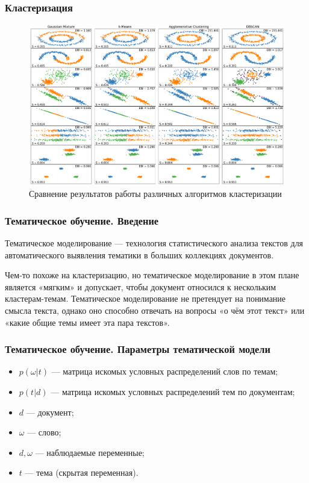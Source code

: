 \documentclass[ucs, notheorems, handout]{beamer}
\begin{document}
		\begin{frame}
	\frametitle{Кластеризация}
	\begin{figure}[H]
	\begin{center}
		\includegraphics[scale = 0.2]{qual.png}
		\caption{Сравнение результатов работы различных алгоритмов кластеризации}
	\end{center}
\end{figure}

	\end{frame}
	
	\begin{frame}
	\frametitle{Тематическое обучение. Введение}
	Тематическое моделирование --- технология статистического анализа текстов для автоматического выявления тематики в больших коллекциях документов.
	
	Чем-то похоже на кластеризацию, но тематическое моделирование в этом плане является «мягким» и допускает, чтобы документ относился к нескольким кластерам-темам. Тематическое моделирование не претендует на понимание смысла текста, однако оно способно отвечать на вопросы «о чём этот текст» или «какие общие темы имеет эта пара текстов».
	\end{frame}
	
	\begin{frame}
	\frametitle{Тематическое обучение. Параметры тематической модели }
	

	\begin{itemize}
	\item $p(\omega | t)$  --- матрица искомых условных распределений слов по темам;
	\item $p(t | d)$ --- матрица искомых условных распределений тем по документам;
	\item $d$ --- документ;
	\item $\omega$ --- слово;
	\item $d,\omega$  --- наблюдаемые переменные;
	\item $t$  --- тема (скрытая переменная).
\end{itemize}


	\end{frame}
	
\end{document}

